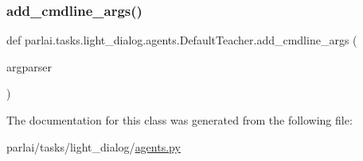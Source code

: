 \subsubsection{\texorpdfstring{add\+\_\+cmdline\+\_\+args()}{add\_cmdline\_args()}}
{\footnotesize\ttfamily def parlai.\+tasks.\+light\+\_\+dialog.\+agents.\+Default\+Teacher.\+add\+\_\+cmdline\+\_\+args (\begin{DoxyParamCaption}\item[{}]{argparser }\end{DoxyParamCaption})\hspace{0.3cm}{\ttfamily [static]}}



The documentation for this class was generated from the following file\+:\begin{DoxyCompactItemize}
\item 
parlai/tasks/light\+\_\+dialog/\hyperlink{parlai_2tasks_2light__dialog_2agents_8py}{agents.\+py}\end{DoxyCompactItemize}
